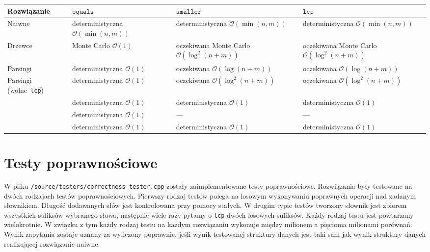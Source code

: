 \documentclass[declaration,shortabstract]{iithesis}
\theoremstyle{definition} \newtheorem{definition}{Definicja}[chapter]
\theoremstyle{plain} \newtheorem{remark}[definition]{Obserwacja}
\theoremstyle{plain} \newtheorem{theorem}[definition]{Twierdzenie}
\theoremstyle{plain} \newtheorem{example}{Przykład}[definition]
\theoremstyle{plain} \newtheorem{lemma}[definition]{Lemat}
\begin{document}
\begin{center}
    \begin{tabular}{ | m{3.5cm} | >{\centering\arraybackslash}m{2.8cm} | >{\centering\arraybackslash}m{2.8cm} | >{\centering\arraybackslash}m{2.8cm} | }
        \hline 
        Rozwiązanie & $\texttt{equals}$ & $\texttt{smaller}$ & $\texttt{lcp}$ \\
        \hline
        Naiwne & deterministyczna $\mathcal{O}(\min(n, m))$ & deterministyczna $\mathcal{O}(\min(n, m))$ & deterministyczna $\mathcal{O}(\min(n, m))$ \\
        \hline
        Drzewce & Monte Carlo $\mathcal{O}(1)$ & oczekiwana Monte Carlo $\mathcal{O}(\log^2(n + m))$ & oczekiwana Monte Carlo $\mathcal{O}(\log^2(n + m))$ \\
        \hline
        Parsingi & deterministyczna $\mathcal{O}(1)$ & oczekiwana $\mathcal{O}(\log(n + m))$ & oczekiwana $\mathcal{O}(\log(n + m))$ \\
        \hline
        Parsingi (wolne~\texttt{lcp}) & deterministyczna $\mathcal{O}(1)$ & oczekiwana $\mathcal{O}(\log^2(n + m))$ & oczekiwana $\mathcal{O}(\log^2(n + m))$ \\
        \hline
        \citeauthor{gawrychowski} & deterministyczna $\mathcal{O}(1)$ & deterministyczna $\mathcal{O}(1)$ & deterministyczna $\mathcal{O}(1)$ \\
        \hline
        \citeauthor{mehlhorn} & deterministyczna $\mathcal{O}(1)$ & --- & ---\\
        \hline
        \citeauthor{alstrup} & deterministyczna $\mathcal{O}(1)$ & deterministyczna $\mathcal{O}(1)$ & deterministyczna $\mathcal{O}(1)$ \\
        \hline
    \end{tabular}
\end{center}

\section{Testy poprawnościowe}

W pliku \texttt{/source/testers/correctness\_tester.cpp} zostały zaimplementowane testy poprawnościowe. Rozwiązania były testowane na dwóch rodzajach testów poprawnościowych. Pierwszy rodzaj testów polega na losowym wykonywaniu poprawnych operacji nad zadanym słownikiem. Długość dodawanych słów jest kontrolowana przy pomocy stałych. W drugim typie testów tworzony słownik jest zbiorem wszystkich sufiksów wybranego słowa, następnie wiele razy pytamy o \texttt{lcp} dwóch losowych sufiksów. Każdy rodzaj testu jest powtarzany wielokrotnie. W związku z tym każdy rodzaj testu na każdym rozwiązaniu wykonuje między milionem a pięcioma milionami porównań. Wynik zapytania zostaje uznany za wyliczony poprawnie, jeśli wynik testowanej struktury danych jest taki sam jak wynik struktury danych realizującej rozwiązanie naiwne.
\end{document}
